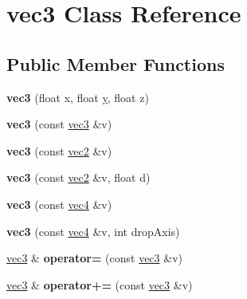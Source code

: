 \hypertarget{classvec3}{\section{vec3 Class Reference}
\label{classvec3}
}
\subsection*{Public Member Functions}
\begin{DoxyCompactItemize}
\item 
\hypertarget{classvec3_a0c11a1f6ed4c349713657dd3452d6ea3}{{\bfseries vec3} (float x, float \hyperlink{_ice_utils_8h_aa7ffaed69623192258fb8679569ff9ba}{y}, float z)}\label{classvec3_a0c11a1f6ed4c349713657dd3452d6ea3}

\item 
\hypertarget{classvec3_a06ea320dd131518426173209e2e9a709}{{\bfseries vec3} (const \hyperlink{classvec3}{vec3} \&v)}\label{classvec3_a06ea320dd131518426173209e2e9a709}

\item 
\hypertarget{classvec3_a73e6bbf289ab4471ceed730a96717c62}{{\bfseries vec3} (const \hyperlink{classvec2}{vec2} \&v)}\label{classvec3_a73e6bbf289ab4471ceed730a96717c62}

\item 
\hypertarget{classvec3_a55469e9d0529d99c0073d2087d65b821}{{\bfseries vec3} (const \hyperlink{classvec2}{vec2} \&v, float d)}\label{classvec3_a55469e9d0529d99c0073d2087d65b821}

\item 
\hypertarget{classvec3_a050ae8cd5cff270b8e3fb4d3174dec78}{{\bfseries vec3} (const \hyperlink{classvec4}{vec4} \&v)}\label{classvec3_a050ae8cd5cff270b8e3fb4d3174dec78}

\item 
\hypertarget{classvec3_a61bb2f9fa43759186053f54c2c5b90cb}{{\bfseries vec3} (const \hyperlink{classvec4}{vec4} \&v, int drop\+Axis)}\label{classvec3_a61bb2f9fa43759186053f54c2c5b90cb}

\item 
\hypertarget{classvec3_a346036974a237bbe1aba74f2219486e7}{\hyperlink{classvec3}{vec3} \& {\bfseries operator=} (const \hyperlink{classvec3}{vec3} \&v)}\label{classvec3_a346036974a237bbe1aba74f2219486e7}

\item 
\hypertarget{classvec3_a614d7b802426ae5d50236e339a47cc16}{\hyperlink{classvec3}{vec3} \& {\bfseries operator+=} (const \hyperlink{classvec3}{vec3} \&v)}\label{classvec3_a614d7b802426ae5d50236e339a47cc16}


\end{DoxyCompactItemize}

